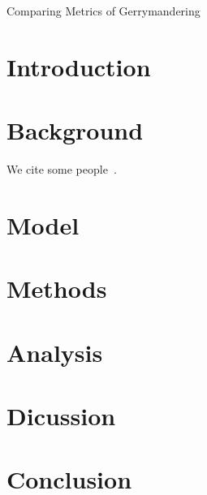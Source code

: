\documentclass[12pt]{article}
\begin{document}
  \begin{center}
    \LARGE Comparing Metrics of Gerrymandering
    \vspace{-0.5em}
  \end{center}
  \doublespacing{}

  \section{Introduction}
  
  \section{Background}

  We cite some people~\cite{chenrodden}.
  
  \section{Model}

  \section{Methods}

  \section{Analysis}

  \section{Dicussion}

  \section{Conclusion}
  
  \singlespacing{}

  
  
\end{document}
